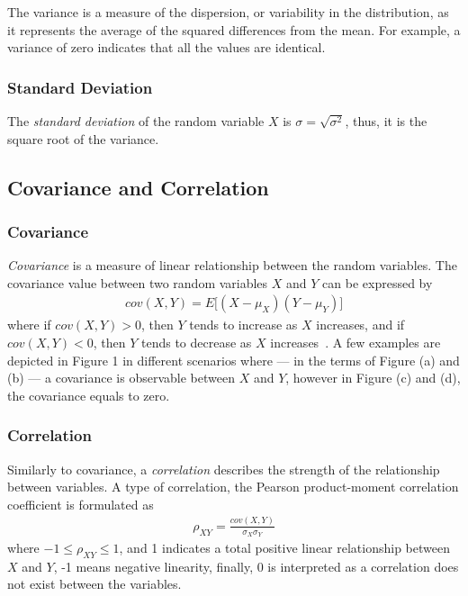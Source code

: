 The variance is a measure of the dispersion, or variability in the distribution, as it represents the average of the squared differences from the mean. For example, a variance of zero indicates that all the values are identical.

\subsubsection{Standard Deviation}

The \textit{standard deviation} of the random variable $X$ is $\sigma = \sqrt{\sigma^2}$, thus, it is the square root of the variance.

\subsection{Covariance and Correlation}

\subsubsection{Covariance}
\textit{Covariance} is a measure of linear relationship between the random variables. The covariance value between two random variables $X$ and $Y$ can be expressed by
\begin{align}
	cov(X,Y) = E\big[(X - \mu_X)(Y - \mu_Y)\big]
\end{align}
where if $cov(X,Y) > 0$, then $Y$ tends to increase as $X$ increases, and if $cov(X,Y) < 0$, then $Y$ tends to decrease as $X$ increases~\cite{covariance}. A few examples are depicted in Figure 1 %
in different scenarios where --- in the terms of Figure (a) and (b) --- a covariance is observable between $X$ and $Y$, however in Figure (c) and (d), the covariance equals to zero.

\subsubsection{Correlation}
Similarly to covariance, a \textit{correlation} describes the strength of the relationship between variables. A type of correlation, the Pearson product-moment correlation coefficient is formulated as
\begin{align}
	\rho_{XY} = \frac{cov(X, Y)}{\sigma_X\sigma_Y}
\end{align}
where $ -1 \leq \rho_{XY} \leq 1$, and 1 indicates a total positive linear relationship between $X$ and $Y$, -1 means negative linearity, finally, 0 is interpreted as a correlation does not exist between the variables.

